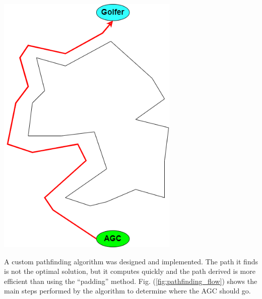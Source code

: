 \documentclass[11pt,landscape]{article}
\newenvironment{Figure}
  {\par\medskip\noindent\minipage{\linewidth}}
  {\endminipage\par\medskip}
\begin{document}
\begin{multicols}{3}
\begin{Figure}
    \begin{mdframed}
        \begin{center}
            \includegraphics[width=0.65\textwidth]{padding.png}
        \end{center}
    \end{mdframed}
    \label{fig:padding}
\end{Figure}

A custom pathfinding algorithm was designed and implemented. The path it finds
is not the optimal solution, but it computes quickly and the path derived is
more efficient than using the ``padding'' method. Fig.
(\ref{fig:pathfinding_flow}) shows the main steps performed by the algorithm to
determine where the AGC should go.


\end{multicols}
\end{document}
